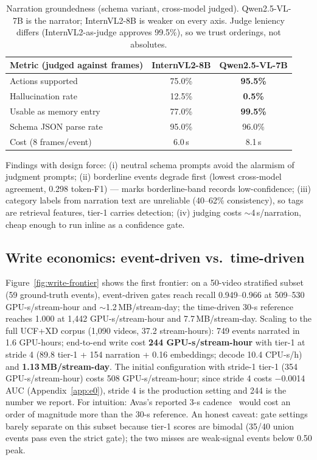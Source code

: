 \begin{table}[h]
\centering
\caption{Narration groundedness (schema variant, cross-model judged). Qwen2.5-VL-7B is the narrator; InternVL2-8B is weaker on every axis. Judge leniency differs (InternVL2-as-judge approves 99.5\%), so we trust orderings, not absolutes.}
\label{tab:grounded}
\small
\begin{tabular}{@{}lcc@{}}
\toprule
Metric (judged against frames) & InternVL2-8B & Qwen2.5-VL-7B \\
\midrule
Actions supported & 75.0\% & \textbf{95.5\%} \\
Hallucination rate & 12.5\% & \textbf{0.5\%} \\
Usable as memory entry & 77.0\% & \textbf{99.5\%} \\
Schema JSON parse rate & 95.0\% & 96.0\% \\
Cost (8 frames/event) & 6.0\,s & 8.1\,s \\
\bottomrule
\end{tabular}
\end{table}

Findings with design force: (i) neutral schema prompts avoid the alarmism of judgment prompts; (ii) borderline events degrade first (lowest cross-model agreement, 0.298 token-F1) --- \sys marks borderline-band records low-confidence; (iii) category labels from narration text are unreliable (40--62\% consistency), so tags are retrieval features, tier-1 carries detection; (iv) judging costs $\sim$4\,s/narration, cheap enough to run inline as a confidence gate.

\subsection{Write economics: event-driven vs.\ time-driven}
\label{sec:exp-write}

Figure~\ref{fig:write-frontier} shows the first frontier: on a 50-video stratified subset (59 ground-truth events), event-driven gates reach recall 0.949--0.966 at 509--530 GPU-s/stream-hour and $\sim$1.2\,MB/stream-day; the time-driven 30-s reference reaches 1.000 at 1{,}442 GPU-s/stream-hour and 7.7\,MB/stream-day. Scaling to the full UCF+XD corpus (1{,}090 videos, 37.2 stream-hours): 749 events narrated in 1.6 GPU-hours; end-to-end write cost \textbf{244 GPU-s/stream-hour} with tier-1 at stride 4 (89.8 tier-1 + 154 narration + 0.16 embeddings; decode 10.4 CPU-s/h) and \textbf{1.13\,MB/stream-day}. The initial configuration with stride-1 tier-1 (354 GPU-s/stream-hour) costs 508 GPU-s/stream-hour; since stride 4 costs $-$0.0014 AUC (Appendix~\ref{app:e0}), stride 4 is the production setting and 244 is the number we report. For intuition: Avas's reported 3-s cadence~\cite{avas} would cost an order of magnitude more than the 30-s reference. An honest caveat: gate settings barely separate on this subset because tier-1 scores are bimodal (35/40 union events pass even the strict gate); the two misses are weak-signal events below 0.50 peak.

